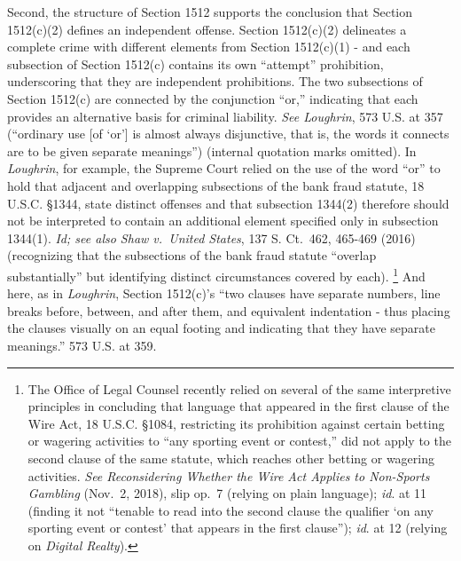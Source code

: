 Second, the structure of Section 1512 supports the conclusion that Section 1512(c)(2) defines an independent offense.
Section 1512(c)(2) delineates a complete crime with different elements from Section 1512(c)(1) - and each subsection of Section 1512(c) contains its own “attempt” prohibition, underscoring that they are independent prohibitions.
The two subsections of Section 1512(c) are connected by the conjunction “or,” indicating that each provides an alternative basis for criminal liability.
\textit{See Loughrin}, 573 U.S. at 357 (“ordinary use [of ‘or’] is almost always disjunctive, that is, the words it connects are to be given separate meanings”) (internal quotation marks omitted).
In \textit{Loughrin}, for example, the Supreme Court relied on the use of the word “or” to hold that adjacent and overlapping subsections of the bank fraud statute, 18 U.S.C. \S 1344, state distinct offenses and that subsection 1344(2) therefore should not be interpreted to contain an additional element specified only in subsection 1344(1).
\textit{Id; see also Shaw v.\ United States}, 137 S. Ct.~462, 465-469 (2016) (recognizing that the subsections of the bank fraud statute “overlap substantially” but identifying distinct circumstances covered by each).%
\footnote{The Office of Legal Counsel recently relied on several of the same interpretive principles in concluding that language that appeared in the first clause of the Wire Act, 18 U.S.C. \S 1084, restricting its prohibition against certain betting or wagering activities to “any sporting event or contest,” did not apply to the second clause of the same statute, which reaches other betting or wagering activities.
\textit{See Reconsidering Whether the Wire Act Applies to Non-Sports Gambling} (Nov.~2, 2018), slip op.~7 (relying on plain language);
\textit{id}. at 11 (finding it not “tenable to read into the second clause the qualifier ‘on any sporting event or contest’ that appears in the first clause”);
\textit{id}. at 12 (relying on \textit{Digital Realty}).}
And here, as in \textit{Loughrin}, Section 1512(c)’s “two clauses have separate numbers, line breaks before, between, and after them, and equivalent indentation - thus placing the clauses visually on an equal footing and indicating that they have separate meanings.” 573 U.S. at 359.

